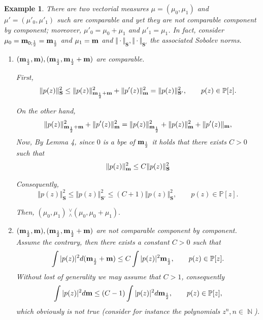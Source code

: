 \documentclass[12pt]{amsart}
\theoremstyle{definition}
\theoremstyle{plain}
\newtheorem{ejem}{Example}
\theoremstyle{remark}
\DeclareMathOperator{\NN}{\mathbb N}
\begin{document}
 
\begin{ejem} There  are two vectorial measures
$\mu=(\mu_0,\mu_1)$  and $\mu'=(\mu'_0,\mu'_1)$ such are comparable and yet they are not comparable component by component;  moreover, $\mu'_0=\mu_0+\mu_1$ and $\mu'_1=\mu_1$. 
In fact, consider $\mu_0={\bf m}_{0;\frac{1}{2}}={\bf m}_{\frac{1}{2}}$ and $\mu_1={\bf m}$ and $\Vert \cdot \Vert_{\mathbf{S}},\Vert \cdot \Vert_{\mathbf{S'}}$ the associated Sobolev norms.

\begin{enumerate}
\item  $({\bf m}_{\frac{1}{2}},{\bf m}), ({\bf m}_{\frac{1}{2}},{\bf m}_{\frac{1}{2}}+{\bf m})$ are comparable. 

\noindent First, 
$$
\Vert p(z) \Vert^{2}_{\mathbf{S}}
\leq  
\Vert p(z) \Vert^{2}_{{\bf m}_{\frac{1}{2}}+{\bf m}} + \Vert p'(z) \Vert^{2}_{{\bf m}}=  \Vert p(z) \Vert^{2}_{\mathbf{S'}}, \qquad p(z) \in \mathbb{P}[z].
$$

\noindent On the other hand, 
$$
\Vert p(z) \Vert^{2}_{{\bf m}_{\frac{1}{2}}+{\bf m}} + \Vert p'(z) \Vert^{2}_{{\bf m}} = \Vert p(z) \Vert^{2}_{{\bf m}_{\frac{1}{2}}} + 
\Vert p(z) \Vert^{2}_{{\bf m}}+
\Vert p'(z)\Vert_{{\bf m}}, 
$$
\noindent Now, By Lemma 4, since $0$ is a bpe of ${\bf m}_{\frac{1}{2}}$ it holds that there exists $C>0$ such that 
$$
\Vert p(z) \Vert^{2}_{{\bf m}} \leq C\Vert p(z) \Vert^2_{\mathbf{S}}
$$

\noindent Consequently, 
$$
\Vert p(z) \Vert^{2}_{\mathbf{S}}\leq 
\Vert p(z) \Vert^{2}_{\mathbf{S'}}\leq (C+1) \Vert p(z) \Vert^{2}_{\mathbf{S}}, \qquad p(z) \in \mathbb{P}[z]. 
$$

\noindent Then, $(\mu_0,\mu_1) \;{}^{\vee}_{\wedge} (\mu_0,\mu_0+\mu_1).$ 

\medskip
\item  $({\bf m}_{\frac{1}{2}},{\bf m}), ({\bf m}_{\frac{1}{2}},{\bf m}_{\frac{1}{2}}+{\bf m})$ are not comparable {\it component by component}. Assume the contrary, then there exists a constant 
 $C>0$ such that 
$$
\int \vert p(z) \vert^2 d({\bf m}_{\frac{1}{2}}+ {\bf m }) \leq C\int \vert p(z) \vert^2{\bf m}_{\frac{1}{2}}, \qquad p(z)\in \mathbb{P}[z].
$$
\noindent Without lost of generality we may assume that $C>1$, consequently  
$$
\int \vert p(z) \vert^{2} d{\bf m} \leq (C-1) \int \vert p(z) \vert^2 d{\bf m}_{\frac{1}{2}}, \qquad p(z)\in \mathbb{P}[z],
$$
\noindent which obviously is not true (consider for instance the polynomials $z^n, n\in \NN$). 



\end{enumerate} 

\end{ejem}
\end{document}
